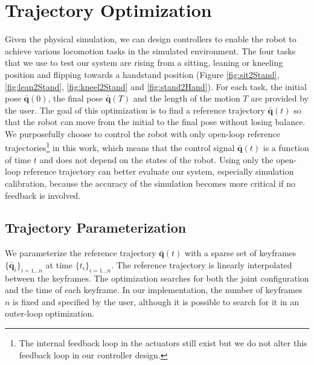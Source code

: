 \section{Trajectory Optimization}

Given the physical simulation, we can design controllers to enable the robot to achieve various locomotion tasks in the simulated environment. The four tasks that we use to test our system are rising from a sitting, leaning or kneeling position and flipping towards a handstand position (Figure \ref{fig:sit2Stand}, \ref{fig:lean2Stand}, \ref{fig:kneel2Stand} and \ref{fig:stand2Hand}). For each task, the initial pose $\bar{\mathbf{q}}(0)$, the final pose $\bar{\mathbf{q}}(T)$ and the length of the motion $T$ are provided by the user. The goal of this optimization is to find a reference trajectory $\bar{\mathbf{q}}(t)$ so that the robot can move from the initial to the final pose without losing balance. We purposefully choose to control the robot with only open-loop reference trajectories\footnote{The internal feedback loop in the actuators still exist but we do not alter this feedback loop in our controller design.} in this work, which means that the control signal $\bar{\mathbf{q}}(t)$ is a function of time $t$ and does not depend on the states of the robot. Using only the open-loop reference trajectory can better evaluate our system, especially simulation calibration, because the accuracy of the simulation becomes more critical if no feedback is involved.

\subsection{Trajectory Parameterization}
We parameterize the reference trajectory $\bar{\mathbf{q}}(t)$ with a sparse set of keyframes $\{\bar{\mathbf{q}}_i\}_{i=1...n}$ at time $\{t_i\}_{i=1...n}$. The reference trajectory is linearly interpolated between the keyframes. The optimization searches for both the joint configuration and the time of each keyframe. In our implementation, the number of keyframes $n$ is fixed and specified by the user, although it is possible to search for it in an outer-loop optimization.

